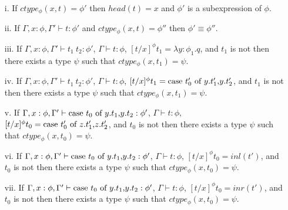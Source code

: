 \begin{lemma}
  \label{lemma:ctype_props_ssfp}

  \begin{itemize}
  \small
  \item[]
  \item[i.] If $ctype_\phi(x,t) = \phi'$ then $head(t) = x$ and $\phi'$ 
    is a subexpression of $\phi$.
    
  \item[ii.] If $\Gamma,x:\phi,\Gamma' \vdash t:\phi'$ and $ctype_\phi(x,t) = \phi''$ then
    $\phi' \equiv \phi''$.

  \item[iii.] If $\Gamma,x:\phi,\Gamma' \vdash t_1\ t_2:\phi'$, $\Gamma \vdash t:\phi$,
    $[t/x]^\phi t_1 = \lambda y:\phi_1.q$, and $t_1$ is not then there exists a type
    $\psi$ such that $ctype_\phi(x,t_1) = \psi$.

  \item[iv.] If $\Gamma,x:\phi,\Gamma' \vdash t_1\ t_2:\phi'$, $\Gamma \vdash t:\phi$,
    $[t/x]^\phi t_1 = \mbox{case}\ t'_0\ \text{of}\ y\text{.}t'_1\text{,}y\text{.}t'_2$, and $t_1$ is not then there exists a type
    $\psi$ such that $ctype_\phi(x,t_1) = \psi$.

  \item[v.] If $\Gamma,x:\phi,\Gamma' \vdash \mbox{case}\ t_0\ \text{of}\ y\text{.}t_1\text{,}y\text{.}t_2:\phi'$, 
    $\Gamma \vdash t:\phi$, $[t/x]^\phi t_0 = \mbox{case}\ t'_0\ \text{of}\ z\text{.}t'_1\text{,}z\text{.}t'_2$, and 
    $t_0$ is not then there exists a type $\psi$ such that $ctype_\phi(x,t_0) = \psi$.

  \item[vi.] If $\Gamma,x:\phi,\Gamma' \vdash \mbox{case}\ t_0\ \text{of}\ y\text{.}t_1\text{,}y\text{.}t_2:\phi'$, 
    $\Gamma \vdash t:\phi$, $[t/x]^\phi t_0 = inl(t')$, and $t_0$ is not then there 
    exists a type $\psi$ such that $ctype_\phi(x,t_0) = \psi$.

  \item[vii.] If $\Gamma,x:\phi,\Gamma' \vdash \mbox{case}\ t_0\ \text{of}\ y\text{.}t_1\text{,}y\text{.}t_2:\phi'$, 
    $\Gamma \vdash t:\phi$, $[t/x]^\phi t_0 = inr(t')$, and $t_0$ is not then 
    there exists a type $\psi$ such that $ctype_\phi(x,t_0) = \psi$.
  \end{itemize}
\end{lemma}

